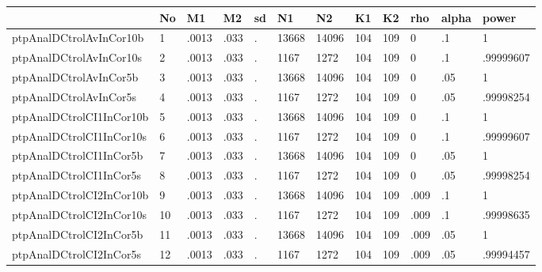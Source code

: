 \begin{table}[htbp]
\begin{tabular}{|l|l|l|l|l|l|l|l|l|l|l|l|}\hline  
 & No  & M1  & M2  & sd  & N1  & N2  & K1  & K2  & rho  & alpha  & power  \\ \hline  
ptpAnalDCtrolAvInCor10b & 1 & .0013 & .033 & . & 13668 & 14096 & 104 & 109 & 0 & .1 & 1 \\ \hline 
ptpAnalDCtrolAvInCor10s & 2 & .0013 & .033 & . & 1167 & 1272 & 104 & 109 & 0 & .1 & .99999607 \\ \hline 
ptpAnalDCtrolAvInCor5b & 3 & .0013 & .033 & . & 13668 & 14096 & 104 & 109 & 0 & .05 & 1 \\ \hline 
ptpAnalDCtrolAvInCor5s & 4 & .0013 & .033 & . & 1167 & 1272 & 104 & 109 & 0 & .05 & .99998254 \\ \hline 
ptpAnalDCtrolCI1InCor10b & 5 & .0013 & .033 & . & 13668 & 14096 & 104 & 109 & 0 & .1 & 1 \\ \hline 
ptpAnalDCtrolCI1InCor10s & 6 & .0013 & .033 & . & 1167 & 1272 & 104 & 109 & 0 & .1 & .99999607 \\ \hline 
ptpAnalDCtrolCI1InCor5b & 7 & .0013 & .033 & . & 13668 & 14096 & 104 & 109 & 0 & .05 & 1 \\ \hline 
ptpAnalDCtrolCI1InCor5s & 8 & .0013 & .033 & . & 1167 & 1272 & 104 & 109 & 0 & .05 & .99998254 \\ \hline 
ptpAnalDCtrolCI2InCor10b & 9 & .0013 & .033 & . & 13668 & 14096 & 104 & 109 & .009 & .1 & 1 \\ \hline 
ptpAnalDCtrolCI2InCor10s & 10 & .0013 & .033 & . & 1167 & 1272 & 104 & 109 & .009 & .1 & .99998635 \\ \hline 
ptpAnalDCtrolCI2InCor5b & 11 & .0013 & .033 & . & 13668 & 14096 & 104 & 109 & .009 & .05 & 1 \\ \hline 
ptpAnalDCtrolCI2InCor5s & 12 & .0013 & .033 & . & 1167 & 1272 & 104 & 109 & .009 & .05 & .99994457 \\ \hline 
  \end{tabular}
\end{table}
